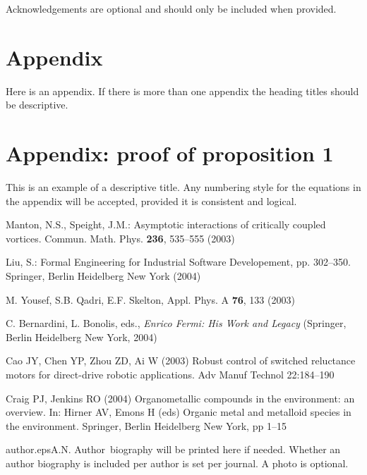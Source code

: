 \documentclass[twocolumn]{svjour3}          %
\begin{document}
\begin{acknowledgements}
Acknowledgements are optional and should only be included when
provided.
\end{acknowledgements}

\appendix

\section{Appendix}
Here is an appendix. If there is more than one appendix the
heading titles should be descriptive.

\section{Appendix: proof of proposition 1}
This is an example of a descriptive title. Any numbering style for
the equations in the appendix will be accepted, provided it is
consistent and logical.

\columncase{}{\newpage}
\begin{thebibliography}{8}

Manton, N.S., Speight, J.M.:
 Asymptotic interactions of critically coupled vortices.
  Commun. Math. Phys. {\bf 236}, 535--555 (2003)

 Liu, S.: Formal Engineering for Industrial Software
Developement, pp. 302--350. Springer, Berlin Heidelberg New York (2004)

M. Yousef, S.B. Qadri, E.F. Skelton, Appl. Phys. A {\bf 76}, 133
(2003)

 C. Bernardini, L. Bonolis, eds., \emph{Enrico Fermi: His Work and
Legacy} (Springer, Berlin Heidelberg New York, 2004)

Cao JY, Chen YP, Zhou ZD, Ai W (2003) Robust control of switched
reluctance motors for direct-drive robotic applications. Adv Manuf
Technol 22:184--190

Craig PJ, Jenkins RO (2004) Organometallic compounds in the
environment: an overview. In: Hirner AV, Emons H (eds) Organic
metal and metalloid species in the environment. Springer, Berlin
Heidelberg New York, pp 1--15

\end{thebibliography}

\begin{authorbiography}{author.eps}{A.N. Author}\
biography will be printed here if needed. Whether an author
biography is included per author is set
per journal. A photo is optional.
\end{authorbiography}
\end{document}

